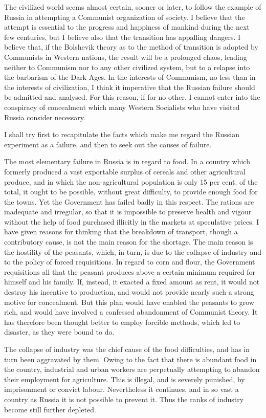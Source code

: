 The civilized world seems almost certain, sooner or later, to follow the example of Russia in attempting a Communist organization of society. I believe that the attempt is essential to the progress and happiness of mankind during the next few centuries, but I believe also that the transition has appalling dangers. I believe that, if the Bolshevik theory as to the method of transition is adopted by Communists in Western nations, the result will be a prolonged chaos, leading neither to Communism nor to any other civilized system, but to a relapse into the barbarism of the Dark Ages. In the interests of Communism, no less than in the interests of civilization, I think it imperative that the Russian failure should be admitted and analysed. For this reason, if for no other, I cannot enter into the conspiracy of concealment which many Western Socialists who have visited Russia consider necessary.

I shall try first to recapitulate the facts which make me regard the Russian experiment as a failure, and then to seek out the causes of failure.

The most elementary failure in Russia is in regard to food. In a country which formerly produced a vast exportable surplus of cereals and other agricultural produce, and in which the non-agricultural population is only 15 per cent. of the total, it ought to be possible, without great difficulty, to provide enough food for the towns. Yet the Government has failed badly in this respect. The rations are inadequate and irregular, so that it is impossible to preserve health and vigour without the help of food purchased illicitly in the markets at speculative prices. I have given reasons for thinking that the breakdown of transport, though a contributory cause, is not the main reason for the shortage. The main reason is the hostility of the peasants, which, in turn, is due to the collapse of industry and to the policy of forced requisitions. In regard to corn and flour, the Government requisitions all that the peasant produces above a certain minimum required for himself and his family. If, instead, it exacted a fixed amount as rent, it would not destroy his incentive to production, and would not provide nearly such a strong motive for concealment. But this plan would have enabled the peasants to grow rich, and would have involved a confessed abandonment of Communist theory. It has therefore been thought better to employ forcible methods, which led to disaster, as they were bound to do.

The collapse of industry was the chief cause of the food difficulties, and has in turn been aggravated by them. Owing to the fact that there is abundant food in the country, industrial and urban workers are perpetually attempting to abandon their employment for agriculture. This is illegal, and is severely punished, by imprisonment or convict labour. Nevertheless it continues, and in so vast a country as Russia it is not possible to prevent it. Thus the ranks of industry become still further depleted.

